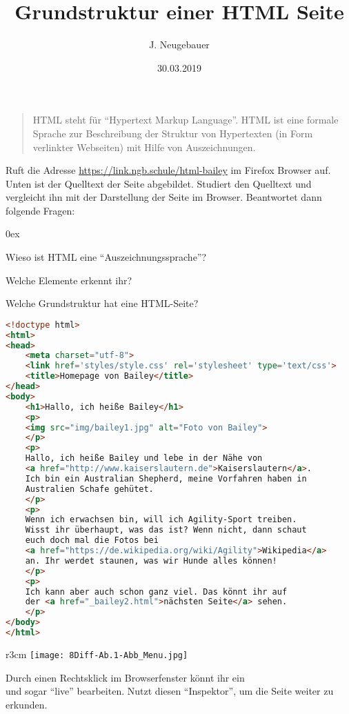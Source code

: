 \documentclass[a4paper,11pt]{scrartcl}
\author{J. Neugebauer}
\title{Grundstruktur einer HTML Seite}
\date{30.03.2019}
\begin{document}

\begin{quote}
HTML steht für \enquote{Hypertext Markup Language}. HTML ist eine formale Sprache zur Beschreibung der Struktur von Hypertexten (in Form verlinkter Webseiten) mit Hilfe von Auszeichnungen.
\end{quote}

\begin{aufgabe}[symbol=\Large\symLaptop]
Ruft die Adresse \url{https://link.ngb.schule/html-bailey} im Firefox Browser auf. Unten ist der Quelltext der Seite abgebildet. Studiert den Quelltext und vergleicht ihn mit der Darstellung der Seite im Browser. Beantwortet dann folgende Fragen:
\begin{enumeratea}\itemsep 0ex
	\item Wieso ist HTML eine \enquote{Auszeichnungssprache}?
	\item Welche Elemente erkennt ihr?
	\item Welche Grundstruktur hat eine HTML-Seite?
\end{enumeratea}
\begin{lstlisting}[language=HTML,basicstyle=\scriptsize\ttfamily]
<!doctype html>
<html>
<head>
	<meta charset="utf-8">
	<link href='styles/style.css' rel='stylesheet' type='text/css'>
	<title>Homepage von Bailey</title>
</head>
<body>
	<h1>Hallo, ich heiße Bailey</h1>
	<p>
	<img src="img/bailey1.jpg" alt="Foto von Bailey">
	</p>
	<p>
	Hallo, ich heiße Bailey und lebe in der Nähe von 
	<a href="http://www.kaiserslautern.de">Kaiserslautern</a>. 
	Ich bin ein Australian Shepherd, meine Vorfahren haben in 
	Australien Schafe gehütet.
	</p>
	<p>
	Wenn ich erwachsen bin, will ich Agility-Sport treiben. 
	Wisst ihr überhaupt, was das ist? Wenn nicht, dann schaut 
	euch doch mal die Fotos bei 
	<a href="https://de.wikipedia.org/wiki/Agility">Wikipedia</a> 
	an. Ihr werdet staunen, was wir Hunde alles können!
	</p>
	<p>
	Ich kann aber auch schon ganz viel. Das könnt ihr auf 
	der <a href="_bailey2.html">nächsten Seite</a> sehen.
	</p>
</body>
</html>
\end{lstlisting}
\end{aufgabe}

\begin{wrapfigure}{r}{3cm}
	\texttt{[image: 8Diff-Ab.1-Abb\_Menu.jpg]}
\end{wrapfigure}
\begin{aufgabe}[symbol=\Large\symLaptop]
	Durch einen Rechtsklick im Browserfenster könnt ihr ein \\
	 und sogar \enquote{live} bearbeiten. Nutzt diesen \enquote{Inspektor}, um die Seite weiter zu \\
	 erkunden.
\end{aufgabe}
\end{document}

